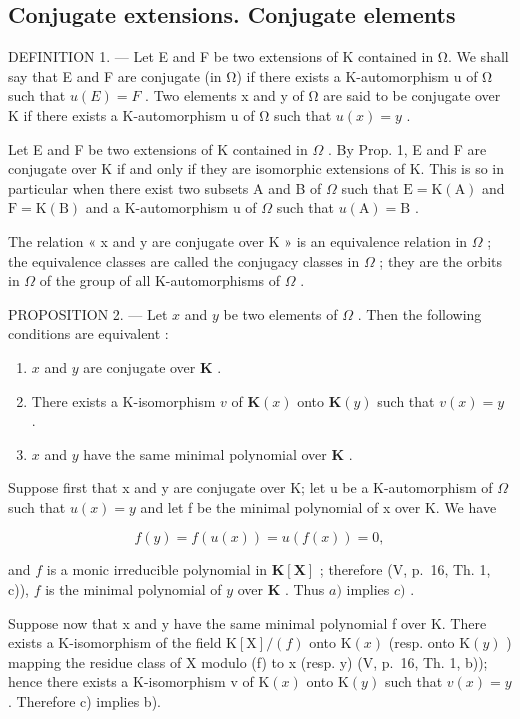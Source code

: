 \subsection{Conjugate extensions. Conjugate elements}

DEFINITION 1. --- Let E and F be two extensions of K contained in Ω. We shall say that E and F are conjugate (in Ω) if there exists a K-automorphism u of Ω such that \(u(E) = F\) . Two elements x and y of Ω are said to be conjugate over K if there exists a K-automorphism u of Ω such that \(u(x) = y\) .

Let E and F be two extensions of K contained in \(\Omega\) . By Prop. 1, E and F are conjugate over K if and only if they are isomorphic extensions of K. This is so in particular when there exist two subsets A and B of \(\Omega\) such that \(\mathrm{E} = \mathrm{K}(\mathrm{A})\) and \(\mathrm{F} = \mathrm{K}(\mathrm{B})\) and a K-automorphism u of \(\Omega\) such that \(u(\mathrm{A}) = \mathrm{B}\) .

The relation « x and y are conjugate over K » is an equivalence relation in \(\Omega\) ; the equivalence classes are called the conjugacy classes in \(\Omega\) ; they are the orbits in \(\Omega\) of the group of all K-automorphisms of \(\Omega\) .

PROPOSITION 2. --- Let \(x\) and \(y\) be two elements of \(\Omega\) . Then the following conditions are equivalent :

\begin{enumerate}
\def\labelenumi{\alph{enumi})}
\item
  \(x\) and \(y\) are conjugate over \(\mathbf{K}\) .
\item
  There exists a K-isomorphism \(v\) of \(\mathbf{K}(x)\) onto \(\mathbf{K}(y)\) such that \(v(x) = y\) .
\item
  \(x\) and \(y\) have the same minimal polynomial over \(\mathbf{K}\) .
\end{enumerate}

Suppose first that x and y are conjugate over K; let u be a K-automorphism of \(\Omega\) such that \(u(x) = y\) and let f be the minimal polynomial of x over K. We have

\[
f (y) = f (u (x)) = u (f (x)) = 0,
\]

and \(f\) is a monic irreducible polynomial in \(\mathbf{K}[\mathbf{X}]\) ; therefore (V, p.~16, Th. 1, c)), \(f\) is the minimal polynomial of \(y\) over \(\mathbf{K}\) . Thus \(a)\) implies \(c)\) .

Suppose now that x and y have the same minimal polynomial f over K. There exists a K-isomorphism of the field \(\mathrm{K}[\mathrm{X}]/(f)\) onto \(\mathrm{K}(x)\) (resp. onto \(\mathrm{K}(y)\) ) mapping the residue class of X modulo (f) to x (resp. y) (V, p.~16, Th. 1, b)); hence there exists a K-isomorphism v of \(\mathrm{K}(x)\) onto \(\mathrm{K}(y)\) such that \(v(x)=y\) . Therefore c) implies b).

